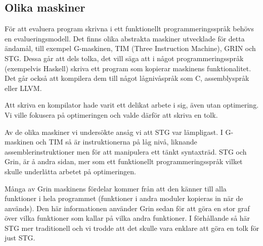 \documentclass[../Core]{subfiles}
\begin{document}
\subsection{Olika maskiner}
För att evaluera program skrivna i ett funktionellt programmeringsspråk
behövs en evalueringsmodell. Det finns olika abstrakta maskiner utvecklade för
detta ändamål, till exempel G-maskinen, TIM (Three Instruction Machine), GRIN \cite{grin} och STG.
Dessa går att dels tolka, det vill säga att i något programmeringsspråk (exempelvis
Haskell) skriva ett program som kopierar maskinens funktionalitet. Det går också att
kompilera dem till något lågnivåspråk som C, assemblyspråk eller LLVM.

Att skriva en kompilator hade varit ett delikat arbete i sig, även utan
optimering. Vi ville fokusera på optimeringen och valde därför att skriva en tolk.

Av de olika maskiner vi undersökte ansåg vi att STG var lämpligast. I G-maskinen och TIM så är
instruktionerna på låg nivå, liknande assemblerinstruktioner men för att manipulera
ett tänkt syntaxträd. STG och Grin, är å andra sidan, mer som ett funktionellt
programmeringsspråk vilket skulle underlätta arbetet på optimeringen.

Många av Grin maskinens fördelar kommer från att den känner till alla funktioner i hela
programmet (funktioner i andra moduler kopieras in när de används). Den här informationen
använder Grin sedan för att göra en stor graf över vilka funktioner som kallar på
vilka andra funktioner. I förhållande så här STG mer traditionell och vi trodde att det skulle
vara enklare att göra en tolk för just STG.
\end{document}
